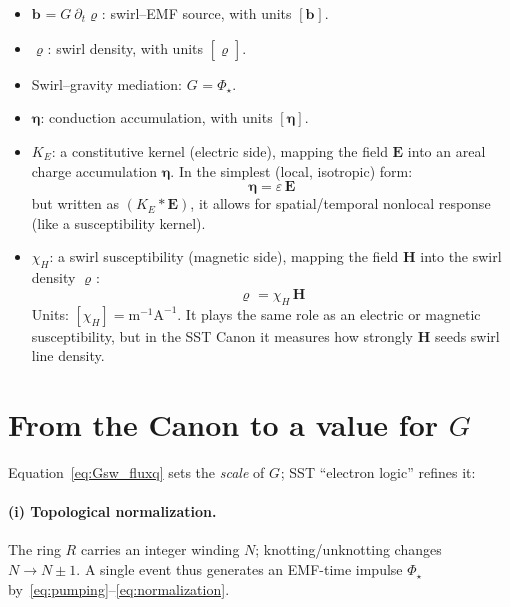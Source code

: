 \documentclass[10pt,reprint,aps,onecolumn,nofootinbib]{revtex4-2}
\def\boldsymbol#1{#1}%
\def\mathcal#1{#1}%
\def\!{}%
\def\swirlarrow{}%
\DeclareRobustCommand{\swirlarrow}{%
    \mathchoice{\mkern-2mu\scriptstyle\boldsymbol{\circlearrowleft}}%
    {\mkern-2mu\scriptstyle\boldsymbol{\circlearrowleft}}%
    {\mkern-2mu\scriptscriptstyle\boldsymbol{\circlearrowleft}}%
    {\mkern-2mu\scriptscriptstyle\boldsymbol{\circlearrowleft}}%
}
\begin{document}
\begin{itemize}
    \item $\mathbf{b}_{\swirlarrow}=\mathcal G_{\swirlarrow}\,\partial_t\bm{\varrho}_{\swirlarrow}$: swirl--EMF source, with units $[\mathbf b_{\swirlarrow}]$.
    \item $\bm{\varrho}_{\swirlarrow}$: swirl density, with units $[\bm{\varrho}_{\swirlarrow}]$.
    \item Swirl--gravity mediation: $\mathcal G_{\swirlarrow}=\Phi_\star$.
    \item $\bm{\eta}$: conduction accumulation, with units $[\bm{\eta}]$.
    \item $\mathcal{K}_E$: a constitutive kernel (electric side), mapping the field $\mathbf{E}$ into an areal charge accumulation $\bm{\eta}$. In the simplest (local, isotropic) form:
    \[
        \bm{\eta} = \varepsilon\,\mathbf{E}
    \]
    but written as $(\mathcal{K}_E * \mathbf{E})$, it allows for spatial/temporal nonlocal response (like a susceptibility kernel).
    \item $\chi_H$: a swirl susceptibility (magnetic side), mapping the field $\mathbf{H}$ into the swirl density $\bm{\varrho}_{\swirlarrow}$:
    \[
        \bm{\varrho}_{\swirlarrow} = \chi_H\,\mathbf{H}
    \]
    Units: $[\chi_H] = \mathrm{m^{-1}A^{-1}}$. It plays the same role as an electric or magnetic susceptibility, but in the SST Canon it measures how strongly $\mathbf{H}$ seeds swirl line density.
\end{itemize}












\section{From the Canon to a value for \texorpdfstring{$\mathcal G$}{G}}
Equation~\ref{eq:Gsw_fluxq} sets the \emph{scale} of $\mathcal G_{\swirlarrow}$; SST “electron logic” refines it:

\paragraph{(i) Topological normalization.}
    The ring $\mathcal R$ carries an integer winding $N$; knotting/unknotting changes $N\!\to\!N\pm1$. A single event thus generates an EMF-time impulse $\Phi_\star$ by~\ref{eq:pumping}--\ref{eq:normalization}.
\end{document}
